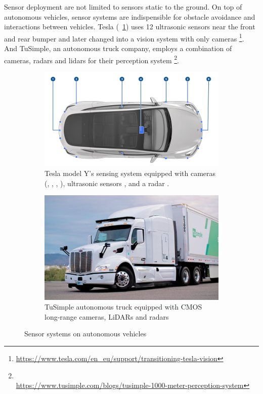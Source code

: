Sensor deployment are not limited to sensors static to the ground.
On top of autonomous vehicles, sensor systems are indispensible for obstacle avoidance and interactions between vehicles.
Tesla (~\ref{fig:intro-tesla}) uses 12 ultrasonic sensors 
near the front and rear bumper 
and later changed into a vision system with only cameras 
\footnote{\url{https://www.tesla.com/en_eu/support/transitioning-tesla-vision}}. 
And TuSimple, an autonomous truck company, employs a combination of cameras, radars and lidars 
for their perception system \footnote{\\\url{https://www.tusimple.com/blogs/tusimple-1000-meter-perception-system}}. 

\begin{figure}[ht] 
    \centering 

    \begin{subfigure}[b]{0.49\textwidth} 
        \includegraphics[width=\textwidth]{figures/tesla.png} 
        \caption{
        Tesla model Y's sensing system
        equipped with cameras (, 
        , 
        , ),
        ultrasonic sensors , and a radar .
        }
        \label{fig:intro-tesla} 
    \end{subfigure} \hfill
    \begin{subfigure}[b]{0.4\textwidth} 
        \includegraphics[width=\textwidth]{figures/tusimple.jpg} 
        \caption{TuSimple autonomous truck equipped with CMOS long-range cameras, 
        LiDARs and radars} 
        \label{fig:intro-truckcam} 
    \end{subfigure} 
    \caption{Sensor systems on autonomous vehicles}
    \label{fig:intro-autonomous-vehicles}
\end{figure} 

